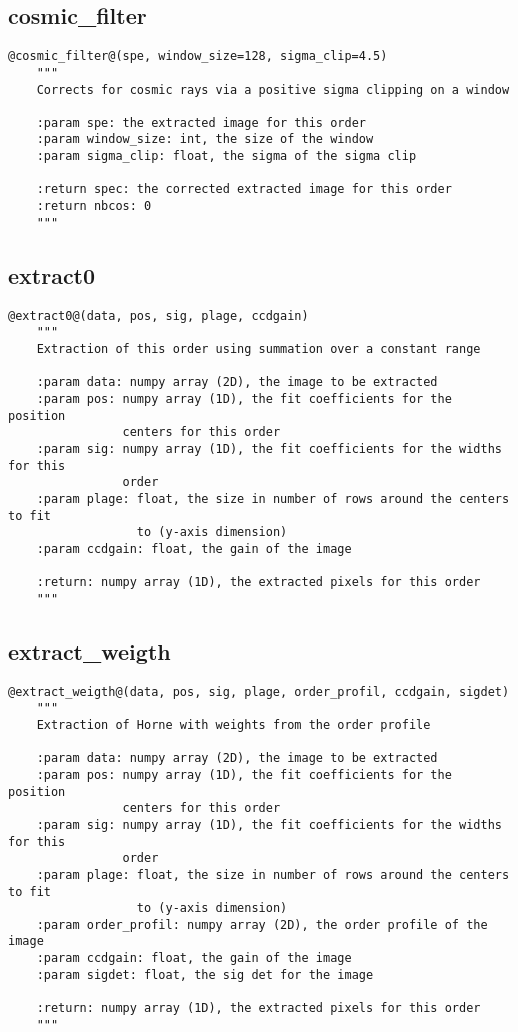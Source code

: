 \subsection{cosmic\_filter}
\begin{lstlisting}[style=pythonstyle]
@cosmic_filter@(spe, window_size=128, sigma_clip=4.5)
    """
    Corrects for cosmic rays via a positive sigma clipping on a window
    
    :param spe: the extracted image for this order
    :param window_size: int, the size of the window
    :param sigma_clip: float, the sigma of the sigma clip
    
    :return spec: the corrected extracted image for this order
    :return nbcos: 0 
    """

\end{lstlisting}

\subsection{extract0}
\begin{lstlisting}[style=pythonstyle]
@extract0@(data, pos, sig, plage, ccdgain)
    """
    Extraction of this order using summation over a constant range
    
    :param data: numpy array (2D), the image to be extracted
    :param pos: numpy array (1D), the fit coefficients for the position 
                centers for this order
    :param sig: numpy array (1D), the fit coefficients for the widths for this
                order
    :param plage: float, the size in number of rows around the centers to fit
                  to (y-axis dimension)
    :param ccdgain: float, the gain of the image
    
    :return: numpy array (1D), the extracted pixels for this order
    """
\end{lstlisting}

\subsection{extract\_weigth}
\begin{lstlisting}[style=pythonstyle]
@extract_weigth@(data, pos, sig, plage, order_profil, ccdgain, sigdet)
    """
    Extraction of Horne with weights from the order profile
    
    :param data: numpy array (2D), the image to be extracted
    :param pos: numpy array (1D), the fit coefficients for the position
                centers for this order
    :param sig: numpy array (1D), the fit coefficients for the widths for this
                order
    :param plage: float, the size in number of rows around the centers to fit
                  to (y-axis dimension)
    :param order_profil: numpy array (2D), the order profile of the image
    :param ccdgain: float, the gain of the image
    :param sigdet: float, the sig det for the image
    
    :return: numpy array (1D), the extracted pixels for this order
    """
\end{lstlisting}


